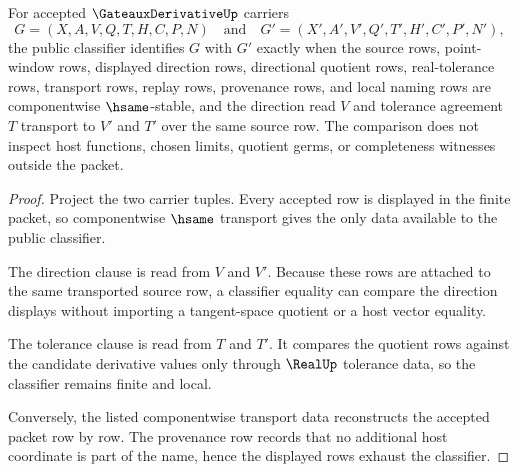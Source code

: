 \begin{theorem}
\label{thm:gateaux-derivative-classifier-adequacy}
For accepted $\GateauxDerivativeUp$ carriers
$$
G=(X,A,V,Q,T,H,C,P,N)
\quad\text{and}\quad
G'=(X',A',V',Q',T',H',C',P',N'),
$$
the public classifier identifies $G$ with $G'$ exactly when the source rows, point-window rows, displayed direction rows, directional quotient rows, real-tolerance rows, transport rows, replay rows, provenance rows, and local naming rows are componentwise $\hsame$-stable, and the direction read $V$ and tolerance agreement $T$ transport to $V'$ and $T'$ over the same source row. The comparison does not inspect host functions, chosen limits, quotient germs, or completeness witnesses outside the packet.
\end{theorem}
\begin{proof}
Project the two carrier tuples. Every accepted row is displayed in the finite packet, so componentwise $\hsame$ transport gives the only data available to the public classifier.

The direction clause is read from $V$ and $V'$. Because these rows are attached to the same transported source row, a classifier equality can compare the direction displays without importing a tangent-space quotient or a host vector equality.

The tolerance clause is read from $T$ and $T'$. It compares the quotient rows against the candidate derivative values only through $\RealUp$ tolerance data, so the classifier remains finite and local.

Conversely, the listed componentwise transport data reconstructs the accepted packet row by row. The provenance row records that no additional host coordinate is part of the name, hence the displayed rows exhaust the classifier.
\end{proof}

